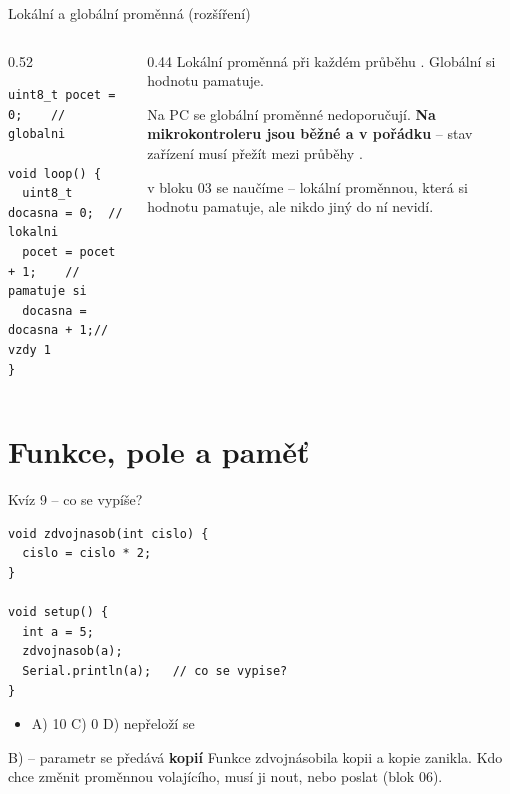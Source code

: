 \documentclass[12pt,aspectratio=169]{beamer}
\newenvironment{odpovedi}{\footnotesize\begin{itemize}\itemsep1pt}{\end{itemize}}
\newcommand{\spravne}[1]{\alt<1>{#1}{\pozor{#1}}}
\newcommand{\roz}{ {\normalfont\footnotesize\textcolor{SPSGrey}{(rozšíření)}}}
\begin{document}
\begin{frame}[fragile]{Lokální a globální proměnná\roz}
  \begin{columns}[T]
    \begin{column}{0.52\textwidth}
\begin{lstlisting}[style=arduino_bez_cisel]
uint8_t pocet = 0;    // globalni

void loop() {
  uint8_t docasna = 0;  // lokalni
  pocet = pocet + 1;    // pamatuje si
  docasna = docasna + 1;// vzdy 1
}
\end{lstlisting}
    \end{column}
    \begin{column}{0.44\textwidth}
      \footnotesize
      Lokální proměnná při každém průběhu  .
      Globální si hodnotu pamatuje.

      \vspace{2mm}
      Na PC se globální proměnné nedoporučují. \textbf{Na mikrokontroleru jsou
      běžné a v pořádku} -- stav zařízení musí přežít mezi průběhy .

      \vspace{2mm}
      \scriptsize
       v bloku 03 se naučíme  -- lokální proměnnou,
      která si hodnotu pamatuje, ale nikdo jiný do ní nevidí.
    \end{column}
  \end{columns}
\end{frame}

\section{Funkce, pole a paměť}

\begin{frame}[fragile]{Kvíz 9 -- co se vypíše?}
\begin{lstlisting}[style=arduino_bez_cisel]
void zdvojnasob(int cislo) {
  cislo = cislo * 2;
}

void setup() {
  int a = 5;
  zdvojnasob(a);
  Serial.println(a);   // co se vypise?
}
\end{lstlisting}

  \begin{odpovedi}
    \item[] A) 10 \qquad \spravne{B) 5} \qquad C) 0 \qquad D) nepřeloží se
  \end{odpovedi}

  \pause
  \vspace{-2mm}
  \begin{exampleblock}{B) -- parametr se předává \textbf{kopií}}
    \footnotesize Funkce zdvojnásobila kopii a kopie zanikla. Kdo chce změnit
    proměnnou volajícího, musí ji nout, nebo poslat  (blok 06).
  \end{exampleblock}
\end{frame}
\end{document}
